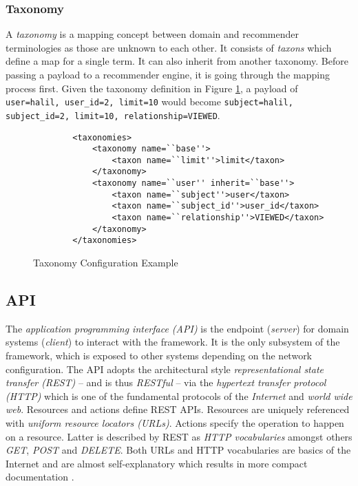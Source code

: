 \subsubsection{Taxonomy}

A \emph{taxonomy} is a mapping concept between domain and recommender terminologies as those are unknown to each other. It consists of \emph{taxons} which define a map for a single term. It can also inherit from another taxonomy. Before passing a payload to a recommender engine, it is going through the mapping process first. Given the taxonomy definition in Figure \ref{fig:architecture-framework-taxonomy}, a payload of \texttt{user=halil, user_id=2, limit=10} would become \texttt{subject=halil, subject_id=2, limit=10, relationship=VIEWED}.

\begin{figure}[ht]
    \begin{verbatim}
        <taxonomies>
            <taxonomy name=``base''>
                <taxon name=``limit''>limit</taxon>
            </taxonomy>
            <taxonomy name=``user'' inherit=``base''>
                <taxon name=``subject''>user</taxon>
                <taxon name=``subject_id''>user_id</taxon>
                <taxon name=``relationship''>VIEWED</taxon>
            </taxonomy>
        </taxonomies>
    \end{verbatim}
    \caption{Taxonomy Configuration Example}
    \label{fig:architecture-framework-taxonomy}
\end{figure}

\subsection{API}

The \emph{application programming interface (API)} is the endpoint (\emph{server}) for domain systems (\emph{client}) to interact with the framework. It is the only subsystem of the framework, which is exposed to other systems depending on the network configuration. The API adopts the architectural style \emph{representational state transfer (REST)} -- and is thus \emph{RESTful} -- via the \emph{hypertext transfer protocol (HTTP)} which is one of the fundamental protocols of the \emph{Internet} and \emph{world wide web}. Resources and actions define REST APIs. Resources are uniquely referenced with \emph{uniform resource locators (URLs)}. Actions specify the operation to happen on a resource. Latter is described by REST as \emph{HTTP vocabularies} amongst others \emph{GET}, \emph{POST} and \emph{DELETE}. Both URLs and HTTP vocabularies are basics of the Internet and are almost self-explanatory which results in more compact documentation \cite{fielding00}.

